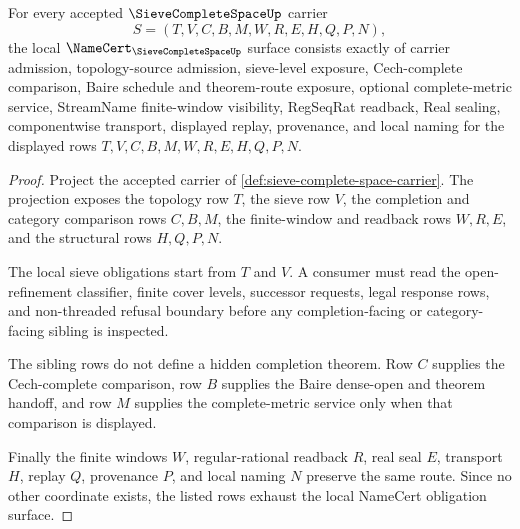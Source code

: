 \begin{theorem}
\label{thm:sieve-complete-space-namecert-obligations}
For every accepted $\SieveCompleteSpaceUp$ carrier
$$
S=(T,V,C,B,M,W,R,E,H,Q,P,N),
$$
the local $\NameCert_{\SieveCompleteSpaceUp}$ surface consists exactly of carrier admission, topology-source admission, sieve-level exposure, Cech-complete comparison, Baire schedule and theorem-route exposure, optional complete-metric service, StreamName finite-window visibility, RegSeqRat readback, Real sealing, componentwise transport, displayed replay, provenance, and local naming for the displayed rows $T,V,C,B,M,W,R,E,H,Q,P,N$.
\end{theorem}
\begin{proof}
Project the accepted carrier of \autoref{def:sieve-complete-space-carrier}. The projection exposes the topology row $T$, the sieve row $V$, the completion and category comparison rows $C,B,M$, the finite-window and readback rows $W,R,E$, and the structural rows $H,Q,P,N$.

The local sieve obligations start from $T$ and $V$. A consumer must read the open-refinement classifier, finite cover levels, successor requests, legal response rows, and non-threaded refusal boundary before any completion-facing or category-facing sibling is inspected.

The sibling rows do not define a hidden completion theorem. Row $C$ supplies the Cech-complete comparison, row $B$ supplies the Baire dense-open and theorem handoff, and row $M$ supplies the complete-metric service only when that comparison is displayed.

Finally the finite windows $W$, regular-rational readback $R$, real seal $E$, transport $H$, replay $Q$, provenance $P$, and local naming $N$ preserve the same route. Since no other coordinate exists, the listed rows exhaust the local NameCert obligation surface.
\end{proof}

